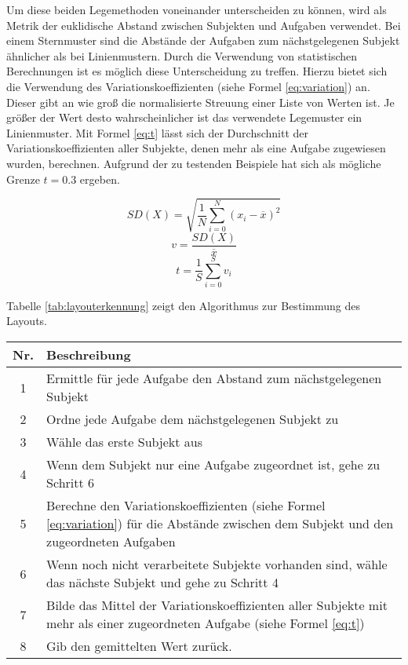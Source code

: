 Um diese beiden Legemethoden voneinander unterscheiden zu können, wird als Metrik der euklidische Abstand zwischen Subjekten und Aufgaben verwendet. Bei einem Sternmuster sind die Abstände der Aufgaben zum nächstgelegenen Subjekt ähnlicher als bei Linienmustern. Durch die Verwendung von statistischen Berechnungen ist es möglich diese Unterscheidung zu treffen. Hierzu bietet sich die Verwendung des Variationskoeffizienten (siehe Formel \ref{eq:variation}) an. Dieser gibt an wie groß die normalisierte Streuung einer Liste von Werten ist. Je größer der Wert desto wahrscheinlicher ist das verwendete Legemuster ein Linienmuster. Mit Formel \ref{eq:t} lässt sich der Durchschnitt der Variationskoeffizienten aller Subjekte, denen mehr als eine Aufgabe zugewiesen wurden, berechnen. Aufgrund der zu testenden Beispiele hat sich als mögliche Grenze $t=0.3$ ergeben.

\begin{equation}
	\label{eq:deviation}
	SD(X)=\sqrt{\frac{1}{N}\sum_{i=0}^{N}\left(x_i - \overline{x}\right)^2} 
\end{equation}
\begin{equation}
	\label{eq:variation}
	v=\frac{SD(X)}{\overline{x}} 
\end{equation}
\begin{equation}
	\label{eq:t}
	t=\frac{1}{S}\sum_{i=0}^{S}v_{i}
\end{equation}

Tabelle \ref{tab:layouterkennung} zeigt den Algorithmus zur Bestimmung des Layouts.
\begin{center}
	\label{tab:layouterkennung}
	\begin{tabularx}
		{1.0\linewidth}{ c X } \textbf{Nr.} & \textbf{Beschreibung} \\
		\hline 1 & Ermittle für jede Aufgabe den Abstand zum nächstgelegenen Subjekt \\
		\hline 2 & Ordne jede Aufgabe dem nächstgelegenen Subjekt zu \\
		\hline 3 & Wähle das erste Subjekt aus \\
		\hline 4 & Wenn dem Subjekt nur eine Aufgabe zugeordnet ist, gehe zu Schritt 6 \\
		\hline 5 & Berechne den Variationskoeffizienten (siehe Formel  \ref{eq:variation}) für die Abstände zwischen dem Subjekt und den zugeordneten Aufgaben \\
		\hline 6 & Wenn noch nicht verarbeitete Subjekte vorhanden sind, wähle das nächste Subjekt und gehe zu Schritt 4 \\
		\hline 7 & Bilde das Mittel der Variationskoeffizienten aller Subjekte mit mehr als einer zugeordneten Aufgabe (siehe Formel \ref{eq:t})\\
		\hline 8 & Gib den gemittelten Wert zurück.
	\end{tabularx}
\end{center}

